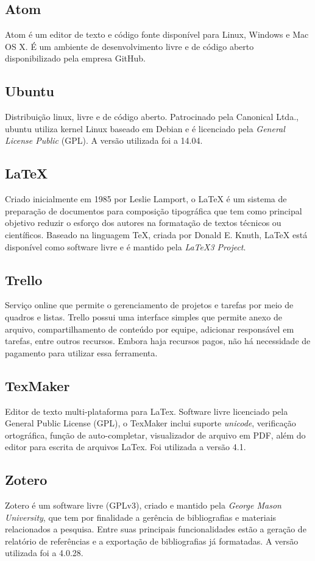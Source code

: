 \subsection{Atom}
Atom é um editor de texto e código fonte disponível para Linux, Windows e Mac OS X. É um ambiente de desenvolvimento livre e de código aberto disponibilizado pela empresa GitHub. 

\subsection{Ubuntu}
Distribuição linux, livre e de código aberto. Patrocinado pela Canonical Ltda., ubuntu utiliza kernel Linux baseado em Debian e é licenciado pela \textit{General License Public} (GPL). A versão utilizada foi a 14.04.  

\subsection{LaTeX}
Criado inicialmente em 1985 por Leslie Lamport, o LaTeX é um sistema de preparação de documentos para composição tipográfica que tem como principal objetivo reduzir o esforço dos autores na formatação de textos técnicos ou científicos. Baseado na linguagem TeX, criada por Donald E. Knuth, LaTeX está disponível como software livre e é mantido pela \textit{LaTeX3 Project}.

\subsection{Trello} 
Serviço online que permite o gerenciamento de projetos e tarefas por meio de quadros e listas. Trello possui uma interface simples que permite anexo de arquivo, compartilhamento de conteúdo por equipe, adicionar responsável em tarefas,  entre outros recursos. Embora haja recursos pagos, não há necessidade de pagamento para utilizar essa ferramenta.

\subsection{TexMaker}
Editor de texto multi-plataforma para LaTex. Software livre licenciado pela General Public License (GPL), o TexMaker inclui suporte \textit{unicode}, verificação ortográfica, função de auto-completar, visualizador de arquivo em PDF, além do editor para escrita de arquivos LaTex. Foi utilizada a versão 4.1.

\subsection{Zotero}
Zotero é um software livre (GPLv3), criado e mantido pela \textit{George Mason University}, que tem por finalidade a gerência de bibliografias e materiais relacionados a pesquisa. Entre suas principais funcionalidades estão a geração de relatório de referências e a exportação de bibliografias já formatadas. A versão utilizada foi a 4.0.28.

